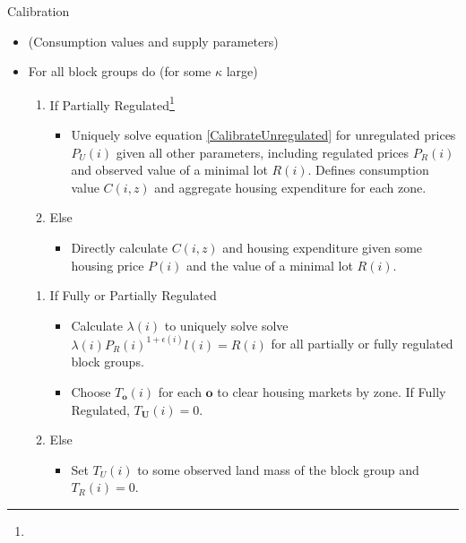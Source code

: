 \documentclass[12pt]{article}
\begin{document}
	\begin{algorithm}
		\caption{Calibration}
		
		
			\begin{itemize}
			\item[] (Consumption values and supply parameters)
			\item[] For all block groups do (for some $\kappa$ large)
			
				\begin{enumerate}
					\item[] If Partially Regulated\footnote{}
					
					\begin{itemize}
						\item[] Uniquely solve equation \eqref{CalibrateUnregulated} for unregulated prices $P_{U}(i)$ given all other parameters, including regulated prices $P_{R}(i)$ and observed value of a minimal lot $R(i)$. Defines consumption value $C(i, z)$ and aggregate housing expenditure for each zone.
					\end{itemize}
					
					\item[]Else 
					
					\begin{itemize}
						\item[] Directly calculate $C(i, z)$ and housing expenditure given some housing price $P(i)$ and the value of a minimal lot $R(i)$. 
					\end{itemize}
									
				\end{enumerate}
				
				\begin{enumerate}
					\item[] If Fully or Partially Regulated
					\begin{itemize}
						\item[] Calculate $\lambda(i)$ to uniquely solve solve $\lambda(i)P_{R}(i)^{1 + \epsilon(i)}l(i) = R(i)$ for all partially or fully regulated block groups.
						
						\item[] Choose $T_{\boldsymbol{o}}(i)$ for each $\boldsymbol{o}$ to clear housing markets by zone. If Fully Regulated, $T_{\boldsymbol{U}}(i) = 0$.
						
					\end{itemize}
					
					\item[] Else
					\begin{itemize}
						\item[] Set $T_{U}(i)$ to some observed land mass of the block group and $T_{R}(i) = 0$. 
						

\end{itemize}
\end{enumerate}
\end{itemize}
\end{algorithm}
\end{document}
